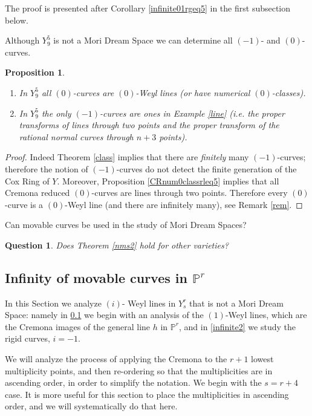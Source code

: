 \documentclass[12pt]{article}
\newtheorem{proposition}[equation]{Proposition}
\newtheorem{question}[equation]{Question}
\numberwithin{equation}{section}
\numberwithin{subeq}{equation}
\def\bbP{\mathbb{P}}
\begin{document}
The proof is presented after Corollary \ref{infinite01rgeq5} in the first subsection below.

Although $Y^5_9$ is not a Mori Dream Space we can determine all $(-1)$- and $(0)$-curves.
\begin{proposition} 
\begin{enumerate}
\item In $Y^5_9$ all $(0)$-curves are $(0)$-Weyl lines (or have numerical $(0)$-classes).
\item In  $Y^5_9$ the only $(-1)$-curves are ones in Example \ref{line}
(i.e.  the proper transforms of lines through two points and the proper transform of the rational normal curves through $n+3$ points).
\end{enumerate}
\end{proposition}
\begin{proof}
 Indeed Theorem \ref{class} implies that there are {\it finitely} many $(-1)$-curves;
 therefore the notion of $(-1)$-curves do not detect the finite generation of the Cox Ring of $Y$. Moreover, Proposition \ref{CRnum0classrleq5} implies that all Cremona reduced $(0)$-curves are lines through two points.
 Therefore every $(0)$-curve is a $(0)$-Weyl line (and there are infinitely many),
 see  Remark \ref{rem}.
\end{proof}

Can movable curves be used in the study of Mori Dream Spaces?
\begin{question} Does Theorem \ref{nms2} hold for other varieties?
\end{question}


\subsection{Infinity of movable curves in $\mathbb{P}^r$}\label{infinite1}


In this Section we analyze $(i)$- Weyl lines in  $Y^r_s$ that is not a Mori Dream Space: namely in \ref{infinite1} we begin with an analysis of the $(1)$-Weyl lines, which are the Cremona images of the general line $h$ in $\bbP^r$, and in \ref{infinite2} we study the rigid curves, $i=-1$.

We will analyze the process of applying the Cremona to the $r+1$ lowest multiplicity points, 
and then re-ordering so that the multiplicities are in ascending order,
in order to simplify the notation. We begin with the $s=r+4$ case. 
It is more useful for this section to place the multiplicities in ascending order,
and we will systematically do that here.
\end{document}
